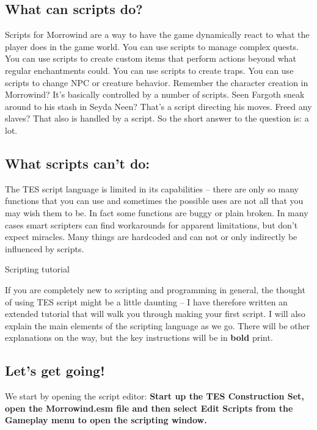 \documentclass[
]{article}
\begin{document}
\hypertarget{what-can-scripts-do}{%
\subsection{What can scripts do?}\label{what-can-scripts-do}}

Scripts for Morrowind are a way to have the game dynamically react to
what the player does in the game world. You can use scripts to manage
complex quests. You can use scripts to create custom items that perform
actions beyond what regular enchantments could. You can use scripts to
create traps. You can use scripts to change NPC or creature behavior.
Remember the character creation in Morrowind? It's basically controlled
by a number of scripts. Seen Fargoth sneak around to his stash in Seyda
Neen? That's a script directing his moves. Freed any slaves? That also
is handled by a script. So the short answer to the question is: a lot.

\hypertarget{what-scripts-cant-do}{%
\subsection{What scripts can't do:}\label{what-scripts-cant-do}}

The TES script language is limited in its capabilities -- there are only
so many functions that you can use and sometimes the possible uses are
not all that you may wish them to be. In fact some functions are buggy
or plain broken. In many cases smart scripters can find workarounds for
apparent limitations, but don't expect miracles. Many things are
hardcoded and can not or only indirectly be influenced by scripts.

\protect\hypertarget{_Toc53412554}{}{}Scripting tutorial

If you are completely new to scripting and programming in general, the
thought of using TES script might be a little daunting -- I have
therefore written an extended tutorial that will walk you through making
your first script. I will also explain the main elements of the
scripting language as we go. There will be other explanations on the
way, but the key instructions will be in \textbf{bold} print.

\hypertarget{lets-get-going}{%
\subsection{Let's get going!}\label{lets-get-going}}

We start by opening the script editor: \textbf{Start up the TES
Construction Set, open the Morrowind.esm file and then select Edit
Scripts from the Gameplay menu to open the scripting window.}
\end{document}
